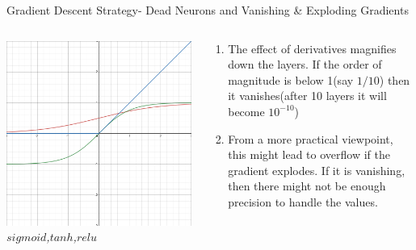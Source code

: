 \begin{frame}{Gradient Descent Strategy- Dead Neurons and Vanishing \& Exploding Gradients}
	\begin{columns}[T]
        \begin{column}{0.5\textwidth}
        	\includegraphics[width=\textwidth]{images/relu.png}
        	\tiny{\textit{$sigmoid$,$tanh$,$relu$}}
        \end{column}
	    \begin{column}{0.5\textwidth}
    	    \begin{enumerate}[$\bullet$]
				\item The effect of derivatives magnifies down the layers. If the order of magnitude is below 1(say $1/10$) then it vanishes(after 10 layers it will become $10^{-10}$)\pause
				\item From a more practical viewpoint, this might lead to overflow if the gradient explodes. If it is vanishing, then there might not be enough precision to handle the values.
			\end{enumerate}
    	\end{column}
    \end{columns}
\end{frame}

